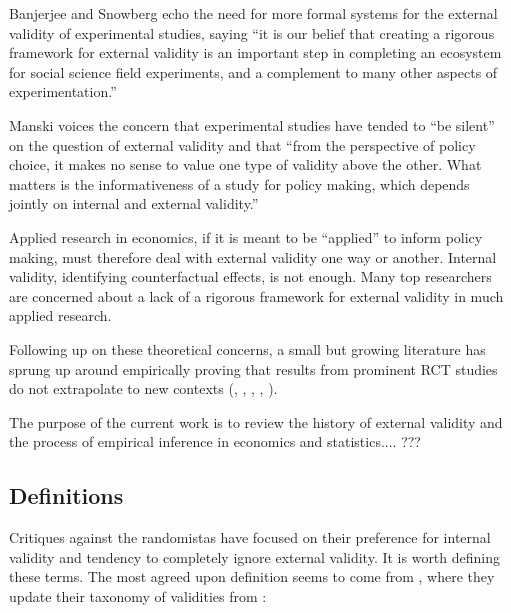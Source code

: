 \documentclass[a4paper,12pt]{article}
\begin{document}
Banjerjee and Snowberg \parencite*{Snowberg2016} echo the need for more formal systems for the external validity of experimental studies, saying ``it is our belief that creating a rigorous framework for external validity is an important step in completing an ecosystem for social science field experiments, and a complement to many other aspects of experimentation.''

Manski \parencite*{Manski2013} voices the concern that experimental studies have tended to ``be silent'' on the question of external validity and that ``from the perspective of policy choice, it makes no sense to value one type of validity above the other. What matters is the informativeness of a study for policy making, which depends jointly on internal and external validity.''

Applied research in economics, if it is meant to be ``applied'' to inform policy making, must therefore deal with external validity one way or another. Internal validity, identifying counterfactual effects, is not enough. Many top researchers are concerned about a lack of a rigorous framework for external validity in much applied research.

Following up on these theoretical concerns, a small but growing literature has sprung up around empirically proving that results from prominent RCT studies do not extrapolate to new contexts (\cite{LantPritchett&JustinSandefur2016}, \cite{Gechter2015}, \cite{Allcott2015}, \cite{Bisbee2017}, \cite{Rosenzweig2019}).


The purpose of the current work is to review the history of external validity and the process of empirical inference in economics and statistics.... ???


\subsection*{Definitions}

Critiques against the randomistas have focused on their preference for internal validity and tendency to completely ignore external validity. It is worth defining these terms. The most agreed upon definition seems to come from \cite{Shadish2002}, where they update their taxonomy of validities from \cite{Cook1979}:
\end{document}
